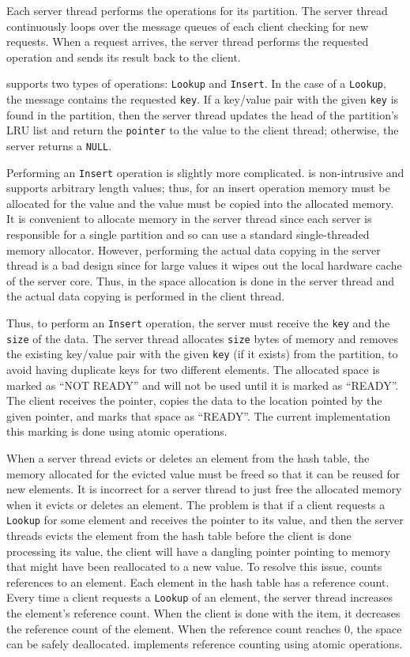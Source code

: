 Each server thread performs the operations for its partition.  The server thread
continuously loops over the message queues of each client checking for new
requests. When a request arrives, the server thread performs the requested
operation and sends its result back to the client.

\cphash{} supports two types of operations: \texttt{Lookup} and \texttt{Insert}.
In the case of a \texttt{Lookup}, the message contains the requested
\texttt{key}. If a key/value pair with the given \texttt{key} is found in the
partition, then the server thread updates the head of the partition's LRU list
and return the \texttt{pointer} to the value to the client thread; otherwise,
the server returns a \texttt{NULL}.

Performing an \texttt{Insert} operation is slightly more complicated. \cphash{}
is non-intrusive and supports arbitrary length values; thus, for an insert
operation memory must be allocated for the value and the value must be copied
into the allocated memory.  It is convenient to allocate memory in the server
thread since each server is responsible for a single partition and so \cphash{}
can use a standard single-threaded memory allocator.  However, performing the
actual data copying in the server thread is a bad design since for large values
it wipes out the local hardware cache of the server core. Thus, in \cphash{} the
space allocation is done in the server thread and the actual data copying is
performed in the client thread.

Thus, to perform an \texttt{Insert} operation, the server must receive the
\texttt{key} and the \texttt{size} of the data. The server thread allocates
\texttt{size} bytes of memory and removes the existing key/value pair with the
given \texttt{key} (if it exists) from the partition, to avoid having duplicate
keys for two different elements.  The allocated space is marked as ``NOT READY''
and will not be used until it is marked as ``READY''.  The client receives the
pointer, copies the data to the location pointed by the given pointer, and marks
that space as ``READY''.  The current \cphash{} implementation this marking is
done using atomic operations. 

When a server thread evicts or deletes an element from the hash table, the
memory allocated for the evicted value must be freed so that it can be reused
for new elements. It is incorrect for a server thread to just free the allocated
memory when it evicts or deletes an element. The problem is that if a client
requests a \texttt{Lookup} for some element and receives the pointer to its
value, and then the server threads evicts the element from the hash table before
the client is done processing its value, the client will have a dangling pointer
pointing to memory that might have been reallocated to a new value.  To resolve
this issue, \cphash{} counts references to an element.  Each element in the hash
table has a reference count. Every time a client requests a \texttt{Lookup} of
an element, the server thread increases the element's reference count. When the
client is done with the item, it decreases the reference count of the element.
When the reference count reaches 0, the space can be safely deallocated.
\cphash{} implements reference counting using atomic operations.

